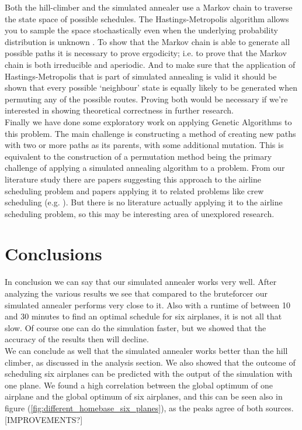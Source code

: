 \documentclass[journal]{IEEEtran}
\begin{document}
Both the hill-climber and the simulated annealer use a Markov chain to traverse the state space of possible schedules. The Hastings-Metropolis algorithm allows you to sample the space stochastically even when the underlying probability distribution is unknown \cite{Hasting1970}. To show that the Markov chain is able to generate all possible paths it is necessary to prove ergodicity; i.e. to prove that the Markov chain is both irreducible and aperiodic. And to make sure that the application of Hastings-Metropolis that is part of simulated annealing is valid it should be shown that every possible `neighbour' state is equally likely to be generated when permuting any of the possible routes. Proving both would be necessary if we're interested in showing theoretical correctness in further research. \\
Finally we have done some exploratory work on applying Genetic Algorithms to this problem. The main challenge is constructing a method of creating new paths with two or more paths as its parents, with some additional mutation. This is equivalent to the construction of a permutation method being the primary challenge of applying a simulated annealing algorithm to a problem. From our literature study there are papers suggesting this approach to the airline scheduling problem and papers applying it to related problems like crew scheduling  (e.g. \cite{Levine1996}). But there is no literature actually applying it to the airline scheduling problem, so this may be interesting area of unexplored research.




\section{Conclusions}
In conclusion we can say that our simulated annealer works very well. After analyzing the various results we see that compared to the bruteforcer our simulated annealer performs very close to it. Also with a runtime of between 10 and 30 minutes to find an optimal schedule for six airplanes, it is not all that slow. Of course one can do the simulation faster, but we showed that the accuracy of the results then will decline.\\
We can conclude as well that the simulated annealer works better than the hill climber, as discussed in the analysis section. We also showed that the outcome of scheduling six airplanes can be predicted with the output of the simulation with one plane. We found a high correlation between the global optimum of one airplane and the global optimum of six airplanes, and this can be seen also in figure (\ref{fig:different_homebase_six_planes}), as the peaks agree of both sources. [IMPROVEMENTS?]


\end{document}
